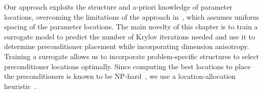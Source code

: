 Our approach exploits the structure and a-priori knowledge of parameter locations, overcoming the limitations of the approach in~\cite[Section~4.6]{pembery2020}, which assumes uniform spacing of the parameter locations.
The main novelty of this chapter is to train a surrogate model to predict the number of Krylov iterations needed and use it to determine preconditioner placement while incorporating dimension anisotropy.
Training a surrogate allows us to incorporate problem-specific structures to select preconditioner locations optimally.
Since computing the best locations to place the preconditioners is known to be NP-hard~\cite{sherali1988}, we use a location-allocation heuristic~\cite{brimberg2008}.